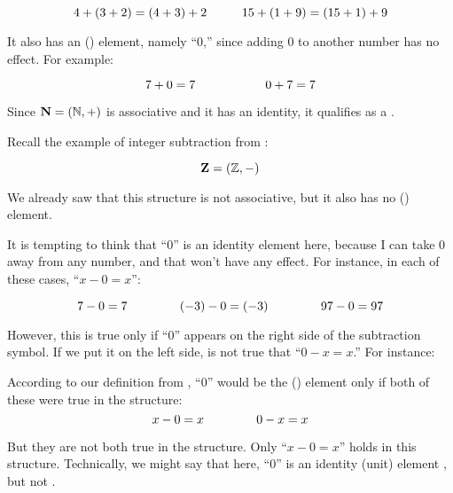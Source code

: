 \documentclass[../../../main.tex]{subfiles}
\begin{document}
\begin{fexample}
\begin{equation*}
  4 + (3 + 2) = (4 + 3) + 2 \hskip 1cm 15 + (1 + 9) = (15 + 1) + 9
\end{equation*}

It also has an  () element, namely ``$0$,'' since adding $0$ to another number has no effect. For example:

\begin{equation*}
  7 + 0 = 7 \hskip 2cm 0 + 7 = 7
\end{equation*}

Since $\algebra{N} = (\Nats/, +)$ is associative and it has an identity, it qualifies as a .

\end{fexample}

\begin{fexample}

Recall the example of integer subtraction from :

\begin{equation*}
  \algebra{Z} = (\Ints/, -)
\end{equation*} 

We already saw that this structure is not associative, but it also has no  () element. 

It is tempting to think that ``$0$'' is an identity element here, because I can take $0$ away from any number, and that won't have any effect. For instance, in each of these cases, ``$x - 0 = x$'':

\begin{equation*}
  7 - 0 = 7 \hskip 1.5cm (-3) - 0 = (-3) \hskip 1.5cm 97 - 0 = 97
\end{equation*}

However, this is true only if ``$0$'' appears on the right side of the subtraction symbol. If we put it on the left side, is not true that ``$0 - x = x$.'' For instance:

\begin{aside}
  \begin{remark}
    According to our definition from , ``$0$'' would be the  () element only if both of these were true in the structure:
    \begin{equation*}
      x - 0 = x \hskip 1.5cm 0 - x = x
    \end{equation*} 
    
    But they are not both true in the structure. Only ``$x - 0 = x$'' holds in this structure. Technically, we might say that here, ``$0$'' is an identity (unit) element , but not .
  \end{remark}
\end{aside}


\end{fexample}
\end{document}
